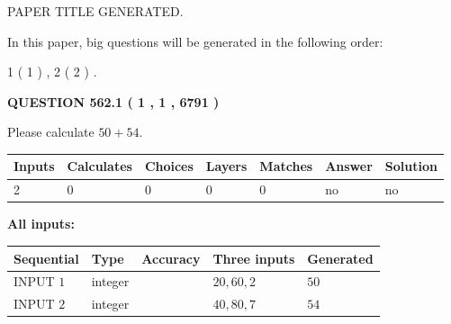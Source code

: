 \documentclass[12pt]{article}
\begin{document}
   
\vspace{0.2in}
   
   
   
   
   
   
   
   
 \vspace{0.2in}
 
 
 
 
   
   
 PAPER TITLE GENERATED.
   
   
   
\vspace{0.2in}
   
In this paper, big questions will be generated in the following order: 
   
   
   1 ( 1 )
 ,
   2 ( 2 )
 .
  
\vspace{0.2in}
  
{\textbf{\Large{QUESTION
562.1 
 ( 1 , 1 , 6791 )
}}}
  
  
 
Please calculate $ %
50 +  %
54 $.
 
 
   
   
   
   
\noindent\begin{tabular}{|l|l|l|l|l|l|l|}
 \hline
Inputs & Calculates & Choices & Layers & Matches & Answer & Solution \\ \hline
 2  & 
 0  & 
 0
  & 
 0  & 
 0  & 
  no & 
  no 
  \\ \hline
 \end{tabular}
   
   
   
   
\noindent{}
   
   
   
   
\noindent\vspace{0.1in}\hspace{-0.08in} {\textbf{\Large{All inputs: }}}
   
   
  
  
\noindent\begin{tabular}{|l|l|l|l|l|}
\hline
 Sequential & Type & Accuracy & Three inputs & Generated \\ 
\hline
 
 
  INPUT $  1 $ & integer &  & $
 20
 , 
 60
 , 
 2
 $ & $ 50 $ 
 \\  \hline  
 
 
  INPUT $  2 $ & integer &  & $
 40
 , 
 80
 , 
 7
 $ & $ 54 $ 
 \\  \hline  
 \end{tabular}
   
\end{document}

